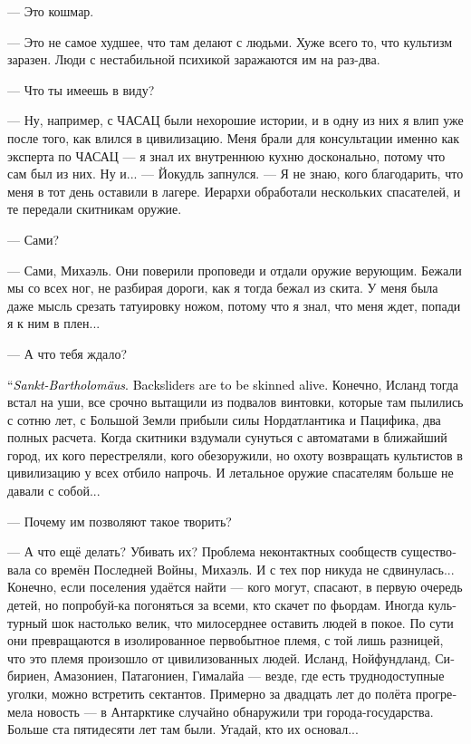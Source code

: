\documentclass[a4paper,12pt,fleqn]{book}\usepackage{cooltooltips}\usepackage{polyglossia}\setdefaultlanguage[babelshorthands=true]{russian}\setotherlanguage{english}\defaultfontfeatures{Ligatures=TeX,Mapping=tex-text} \usepackage{xcolor}\definecolor{lightgray}{HTML}{bbbbbb}\color{lightgray}\newcommand{\ml}[3]{\textenglish{\textcolor{black}{#3}}}
\begin{document}
--- Это кошмар.

--- Это не самое худшее, что там делают с людьми.
Хуже всего то, что культизм заразен.
Люди с нестабильной психикой заражаются им на раз-два.

--- Что ты имеешь в виду?

--- Ну, например, с ЧАСАЦ были нехорошие истории, и в одну из них я влип уже после того, как влился в цивилизацию.
Меня брали для консультации именно как эксперта по ЧАСАЦ --- я знал их внутреннюю кухню досконально, потому что сам был из них.
Ну и... --- Йокудль запнулся.
--- Я не знаю, кого благодарить, что меня в тот день оставили в лагере.
Иерархи обработали нескольких спасателей, и те передали скитникам оружие.

--- Сами?

--- Сами, Михаэль.
Они поверили проповеди и отдали оружие верующим.
Бежали мы со всех ног, не разбирая дороги, как я тогда бежал из скита.
У меня была даже мысль срезать татуировку ножом, потому что я знал, что меня ждет, попади я к ним в плен...

--- А что тебя ждало?

\ml{$0$}
{--- Святой Варфоломей.}
{``\textit{Sankt-Bartholomäus}.}
\ml{$0$}
{С возвращенцев заживо снимали кожу.}
{Backsliders are to be skinned alive.}
Конечно, Исланд тогда встал на уши, все срочно вытащили из подвалов винтовки, которые там пылились с сотню лет, с Большой Земли прибыли силы Нордатлантика и Пацифика, два полных расчета.
Когда скитники вздумали сунуться с автоматами в ближайший город, их кого перестреляли, кого обезоружили, но охоту возвращать культистов в цивилизацию у всех отбило напрочь.
И летальное оружие спасателям больше не давали с собой...

--- Почему им позволяют такое творить?

--- А что ещё делать?
Убивать их?
Проблема неконтактных сообществ существовала со времён Последней Войны, Михаэль.
И с тех пор никуда не сдвинулась...
Конечно, если поселения удаётся найти --- кого могут, спасают, в первую очередь детей, но попробуй-ка погоняться за всеми, кто скачет по фьордам.
Иногда культурный шок настолько велик, что милосерднее оставить людей в покое.
По сути они превращаются в изолированное первобытное племя, с той лишь разницей, что это племя произошло от цивилизованных людей.
Исланд, Нойфундланд, Сибириен, Амазониен, Патагониен, Гималайа --- везде, где есть труднодоступные уголки, можно встретить сектантов.
Примерно за двадцать лет до полёта прогремела новость --- в Антарктике случайно обнаружили три города-государства.
Больше ста пятидесяти лет там были.
Угадай, кто их основал...
\end{document}
